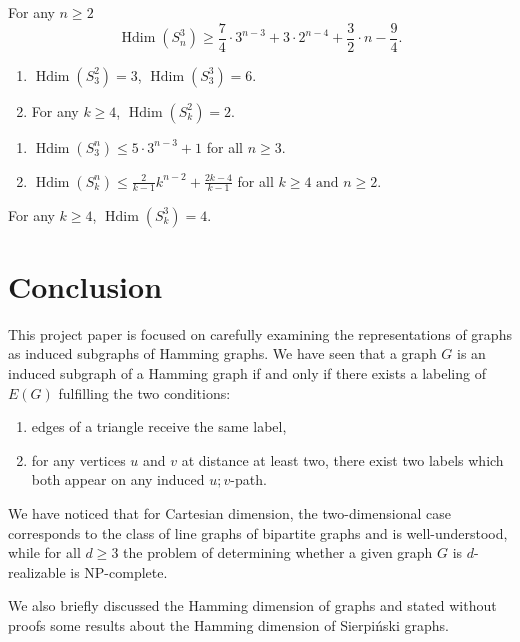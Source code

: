 \documentclass[12pt,a4paper,titlepage,openany]{report}
\DeclareMathOperator{\Hdim}{Hdim}
\begin{document}
\begin{theorem}
For any $n\geq 2$
$$\Hdim( S^3_n)\geq \frac{7}{4}\cdot 3^{n-3}+3\cdot 2^{n-4}+\frac{3}{2}\cdot n-\frac{9}{4}.$$
\end{theorem}

\begin{proposition}
\begin{enumerate}[label=(\roman*)]
\item $\Hdim(S_3^2)=3$, $\Hdim(S_3^3)=6$.
\item For any $k\geq 4$, $\Hdim(S_k^2)=2$.
\end{enumerate}
\end{proposition}

\begin{theorem}
\begin{enumerate}[label=(\roman*)]
\item $\Hdim(S_3^n)\leq 5\cdot 3^{n-3}+1$ for all $n\geq 3$.
\item $\Hdim(S_k^n)\leq \frac{2}{k-1}k^{n-2}+\frac{2k-4}{k-1}$ for all $k\geq 4 \text{ and } n\geq 2$.
\end{enumerate}
\end{theorem}

\begin{corollary}
For any $k\geq 4$, $\Hdim(S_k^3)=4$.
\end{corollary}

\chapter{Conclusion}
This project paper is focused on carefully examining the representations of graphs as induced subgraphs of Hamming graphs. We have seen that a graph $G$ is an induced subgraph of a Hamming graph if and only if there exists a labeling of $E(G)$ fulfilling the two conditions:\begin{enumerate}
\item edges of a triangle receive the same label,
\item for any vertices $u$ and $v$ at distance at least two, there exist two labels which both appear on any induced $u; v$-path.
\end{enumerate}
We have noticed that for Cartesian dimension, the two-dimensional case corresponds to the class of line graphs of bipartite graphs and is well-understood, while for all $d\geq 3$ the problem of determining whether a given graph $G$ is $d$-realizable is NP-complete.

We also briefly discussed the Hamming dimension of graphs and stated without proofs some results about the 
Hamming dimension of Sierpi\'nski graphs.
\end{document}

